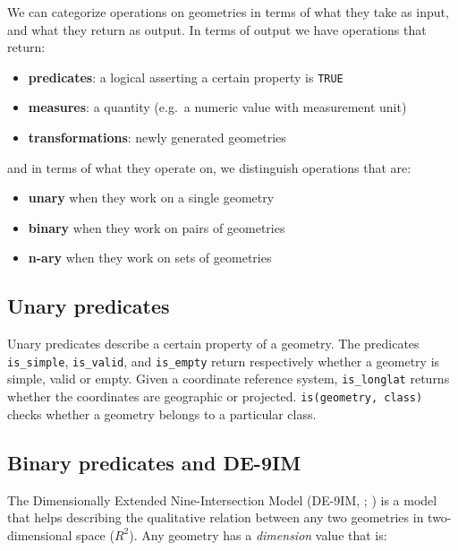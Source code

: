\documentclass[]{book}
\providecommand{\tightlist}{%
  \setlength{\itemsep}{0pt}\setlength{\parskip}{0pt}}
\begin{document}
We can categorize operations on geometries in terms of what they
take as input, and what they return as output. In terms of output
we have operations that return:

\begin{itemize}
\tightlist
\item
  \textbf{predicates}: a logical asserting a certain property is \texttt{TRUE}
\item
  \textbf{measures}: a quantity (e.g.~a numeric value with measurement unit)
\item
  \textbf{transformations}: newly generated geometries
\end{itemize}

and in terms of what they operate on, we distinguish operations
that are:

\begin{itemize}
\tightlist
\item
  \textbf{unary} when they work on a single geometry
\item
  \textbf{binary} when they work on pairs of geometries
\item
  \textbf{n-ary} when they work on sets of geometries
\end{itemize}

\hypertarget{unary-predicates}{%
\subsection{Unary predicates}\label{unary-predicates}}

Unary predicates describe a certain property of a geometry.
The predicates \texttt{is\_simple}, \texttt{is\_valid}, and \texttt{is\_empty} return
respectively whether a geometry is simple, valid or empty. Given a
coordinate reference system, \texttt{is\_longlat} returns whether the
coordinates are geographic or projected. \texttt{is(geometry,\ class)}
checks whether a geometry belongs to a particular class.

\hypertarget{de9im}{%
\subsection{Binary predicates and DE-9IM}\label{de9im}}

The Dimensionally Extended Nine-Intersection Model (DE-9IM,
\citet{de9im1}; \citet{de9im2}) is a model that helps describing the qualitative
relation between any two geometries in two-dimensional space
(\(R^2\)). Any geometry has a \emph{dimension} value that is:
\end{document}
